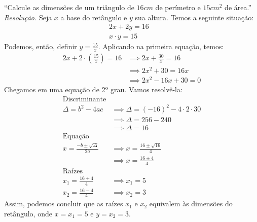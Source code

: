 \enquote{Calcule as dimensões de um triângulo de $16cm$ de perímetro e $15cm^2$ de área.} \\
\emph{Resolução.} Seja $x$ a base do retângulo e $y$ sua altura. Temos a seguinte situação:
\begin{align*}
    2x + 2y = 16 & \\
    x \cdot y = 15 &
\end{align*}
Podemos, então, definir $y = \frac{15}{x}$. Aplicando na primeira equação, temos:
\begin{align*}
    2x + 2\cdot(\frac{15}{x}) = 16 & \implies
    2x + \frac{30}{x} = 16 \\ & \implies
    2x^2 + 30 = 16x \\ & \implies
    2x^2 - 16x + 30 = 0
\end{align*}
Chegamos em uma equação de 2º grau. Vamos resolvê-la:
\begin{align*}
    \text{Discriminante} \\
    \Delta = b^2 - 4ac & \implies \Delta = (-16)^2 - 4\cdot2\cdot30 \\ & \implies
    \Delta = 256 - 240 \\ & \implies \Delta = 16 \\
    \text{Equação}& \\
    x = \frac{-b \pm \sqrt{\Delta}}{2a} & \implies x = \frac{16 \pm \sqrt{16}}{4} \\ & \implies
    x = \frac{16 \pm 4}{4} \\
    \text{Raízes}& \\
    x_1 = \frac{16 + 4}{4} & \implies x_1 = 5 \\
    x_2 = \frac{16 - 4}{4} & \implies x_2 = 3
\end{align*}
Assim, podemos concluir que as raízes $x_1$ e $x_2$ equivalem às dimensões do retângulo, onde $x = x_1 = 5$ e $y = x_2 = 3$.